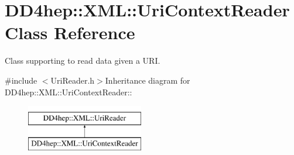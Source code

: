 \hypertarget{class_d_d4hep_1_1_x_m_l_1_1_uri_context_reader}{
\section{DD4hep::XML::UriContextReader Class Reference}
\label{class_d_d4hep_1_1_x_m_l_1_1_uri_context_reader}
}


Class supporting to read data given a URI.  


{\ttfamily \#include $<$UriReader.h$>$}Inheritance diagram for DD4hep::XML::UriContextReader::\begin{figure}[H]
\begin{center}
\leavevmode
\includegraphics[height=2cm]{class_d_d4hep_1_1_x_m_l_1_1_uri_context_reader}
\end{center}
\end{figure}

